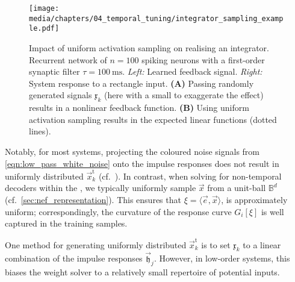 \begin{figure}
	\centering
	\texttt{[image: media/chapters/04\_temporal\_tuning/integrator\_sampling\_example.pdf]}%
	\caption[Impact of uniform activation sampling on realising an integrator]{
	Impact of uniform activation sampling on realising an integrator.
	Recurrent network of $n = 100$ spiking \LIF neurons with a first-order synaptic filter $\tau = \SI{100}{\milli\second}$.
	\emph{Left:} Learned feedback signal.
	\emph{Right:} System response to a rectangle input.
	\textbf{(A)} Passing randomly generated signals $\mathfrak{x}_k$ (here with a small \RMS to exaggerate the effect) results in a nonlinear feedback function.
	\textbf{(B)} Using uniform activation sampling results in the expected linear functions (dotted lines).
	}
	\label{fig:signal_sampling_weights}
\end{figure}

Notably, for most \LTI systems, projecting the coloured noise signals from \cref{eqn:low_pass_white_noise} onto the impulse responses does not result in uniformly distributed $\vec x^\mathrm{t}_k$ (cf.~).
In contrast, when solving for non-temporal decoders within the \NEF, we typically uniformly sample $\vec x$ from a unit-ball $\mathbb{B}^d$ (cf.~\cref{sec:nef_representation}).
This ensures that $\xi = \langle \vec e, \vec x \rangle$, is approximately uniform; correspondingly, the curvature of the response curve $G_i[\xi]$ is well captured in the training samples.

One method for generating uniformly distributed $\vec{x}_k^\mathrm{t}$ is to set $\mathfrak{x}_k$ to a linear combination of the impulse responses $\vec{\mathfrak{h}}_j$.
However, in low-order systems, this biases the weight solver to a relatively small repertoire of potential inputs.

